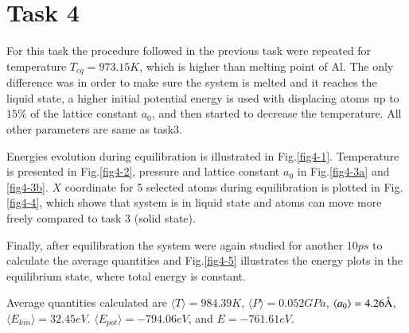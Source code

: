 \section*{Task 4}
For this task the procedure followed in the previous task were repeated for temperature $T_{eq} = 973.15K$, which is higher than melting point of Al. The only difference was in order to make sure the system is melted and it reaches the liquid state, a higher initial potential energy is used with displacing atoms up to $15\%$ of the lattice constant $a_0$, and then started to decrease the temperature. All other parameters are same as task3.

Energies evolution during equilibration is illustrated in Fig.\ref{fig4-1}. Temperature is presented in Fig.\ref{fig4-2}, pressure and lattice constant $a_0$ in Fig.\ref{fig4-3a} and \ref{fig4-3b}. $X$ coordinate for 5 selected atoms during equilibration is plotted in Fig.\ref{fig4-4}, which shows that system is in liquid state and atoms can move more freely compared to task 3 (solid state).

Finally, after equilibration the system were again studied for another $10 ps$ to calculate the average quantities and Fig.\ref{fig4-5} illustrates the energy plots in the equilibrium state, where total energy is constant.

Average quantities calculated are $\langle T \rangle = 984.39K$, $\langle P  \rangle = 0.052 GPa$, $\langle a_0 \rangle = 4.26 \mbox{\normalfont\AA}$, $\langle E_{kin} \rangle = 32.45 eV$. $\langle E_{pot} \rangle = -794.06 eV$, and $E = -761.61 eV$.


